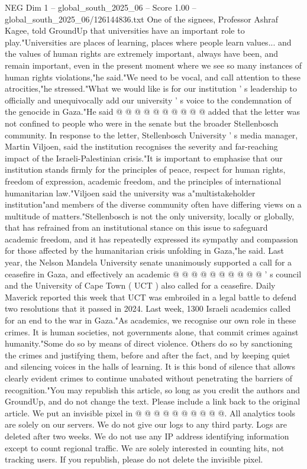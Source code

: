 \begin{textsample}{NEG Dim 1 – global\_south\_2025\_06 – Score 1.00 – global\_south\_2025\_06/126144836.txt}
One of the signees, Professor Ashraf Kagee, told GroundUp that universities have an important role to play."Universities are places of learning, places where people learn values... and the values of human rights are extremely important, always have been, and remain important, even in the present moment where we see so many instances of human rights violations,"he said."We need to be vocal, and call attention to these atrocities,"he stressed."What we would like is for our institution ' s leadership to officially and unequivocally add our university ' s voice to the condemnation of the genocide in Gaza."He said @ @ @ @ @ @ @ @ @ @ added that the letter was not confined to people who were in the senate but the broader Stellenbosch community.
In response to the letter, Stellenbosch University ' s media manager, Martin Viljoen, said the institution recognises the severity and far-reaching impact of the Israeli-Palestinian crisis."It is important to emphasise that our institution stands firmly for the principles of peace, respect for human rights, freedom of expression, academic freedom, and the principles of international humanitarian law."Viljoen said the university was a"multistakeholder institution"and members of the diverse community often have differing views on a multitude of matters."Stellenbosch is not the only university, locally or globally, that has refrained from an institutional stance on this issue to safeguard academic freedom, and it has repeatedly expressed its sympathy and compassion for those affected by the humanitarian crisis unfolding in Gaza,"he said.
Last year, the Nelson Mandela University senate unanimously supported a call for a ceasefire in Gaza, and effectively an academic @ @ @ @ @ @ @ @ @ @ ' s council and the University of Cape Town ( UCT ) also called for a ceasefire.
Daily Maverick reported this week that UCT was embroiled in a legal battle to defend two resolutions that it passed in 2024.
Last week, 1300 Israeli academics called for an end to the war in Gaza."As academics, we recognise our own role in these crimes.
It is human societies, not governments alone, that commit crimes against humanity."Some do so by means of direct violence.
Others do so by sanctioning the crimes and justifying them, before and after the fact, and by keeping quiet and silencing voices in the halls of learning.
It is this bond of silence that allows clearly evident crimes to continue unabated without penetrating the barriers of recognition."You may republish this article, so long as you credit the authors and GroundUp, and do not change the text.
Please include a link back to the original article.
We put an invisible pixel in @ @ @ @ @ @ @ @ @ @.
All analytics tools are solely on our servers.
We do not give our logs to any third party.
Logs are deleted after two weeks.
We do not use any IP address identifying information except to count regional traffic.
We are solely interested in counting hits, not tracking users.
If you republish, please do not delete the invisible pixel.

\end{textsample}
